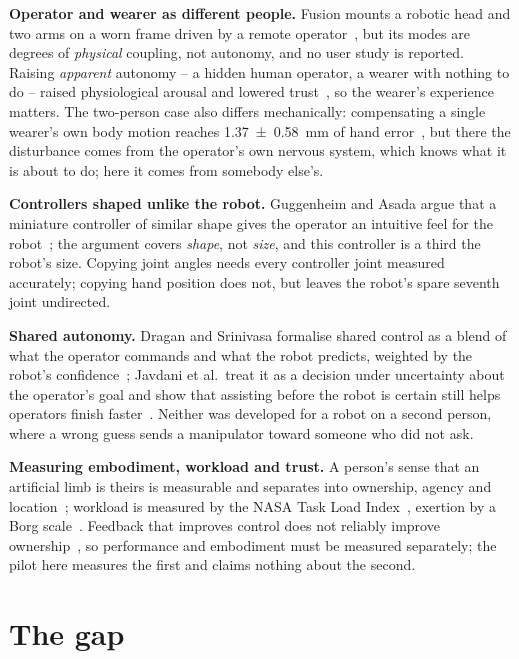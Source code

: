 \textbf{Operator and wearer as different people.} Fusion mounts a robotic
head and two arms on a worn frame driven by a remote
operator~\cite{saraiji2018fusion}, but its modes are degrees of
\emph{physical} coupling, not autonomy, and no user study is reported.
Raising \emph{apparent} autonomy -- a hidden human operator, a wearer with
nothing to do -- raised physiological arousal and lowered
trust~\cite{zhou2026proxemics}, so the wearer's experience matters. The
two-person case also differs mechanically: compensating a single wearer's
own body motion reaches \SI{1.37 \pm 0.58}{\milli\metre} of hand
error~\cite{zhang2024motioncomp}, but there the disturbance comes from the
operator's own nervous system, which knows what it is about to do; here it
comes from somebody else's.

\textbf{Controllers shaped unlike the robot.} Guggenheim and Asada argue
that a miniature controller of similar shape gives the operator an
intuitive feel for the robot~\cite{guggenheim2021haptic}; the argument
covers \emph{shape}, not \emph{size}, and this controller is a third the
robot's size. Copying joint angles needs every controller joint measured
accurately; copying hand position does not, but leaves the robot's spare
seventh joint undirected.

\textbf{Shared autonomy.} Dragan and Srinivasa formalise shared control as
a blend of what the operator commands and what the robot predicts, weighted
by the robot's confidence~\cite{dragan2013policyblending}; Javdani et al.\
treat it as a decision under uncertainty about the operator's goal and show
that assisting before the robot is certain still helps operators finish
faster~\cite{javdani2015hindsight}. Neither was developed for a robot on a
second person, where a wrong guess sends a manipulator toward someone who
did not ask.

\textbf{Measuring embodiment, workload and trust.} A person's sense that an
artificial limb is theirs is measurable and separates into ownership,
agency and location~\cite{botvinick1998rubber,longo2008embodiment};
workload is measured by the NASA Task Load Index~\cite{hart1988nasatlx},
exertion by a Borg scale~\cite{borg1982perceived}. Feedback that improves
control does not reliably improve ownership~\cite{pinardi2023feedback}, so
performance and embodiment must be measured separately; the pilot here
measures the first and claims nothing about the second.

\section{The gap}
\label{sec:gap}

